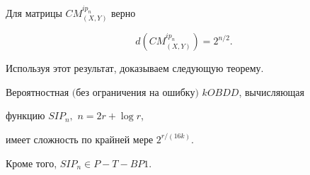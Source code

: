 \begin{thm}


Для матрицы $CM_{(X,Y)}^{ip_n}$ верно


$$


d(CM_{(X,Y)}^{ip_n})=2^{n/2}.


$$


\end{thm}





Используя этот результат, доказываем следующую теорему.








\begin{thm}


Вероятностная $($без ограничения на ошибку$)$ $kOBDD$, вычисляющая


функцию $SIP_n,$ $n=2r+\log r$,


имеет сложность по крайней мере $2^{r/(16k)}$.


Кроме того, $SIP_n\in P{-}T{-}BP1$.


\end{thm}








